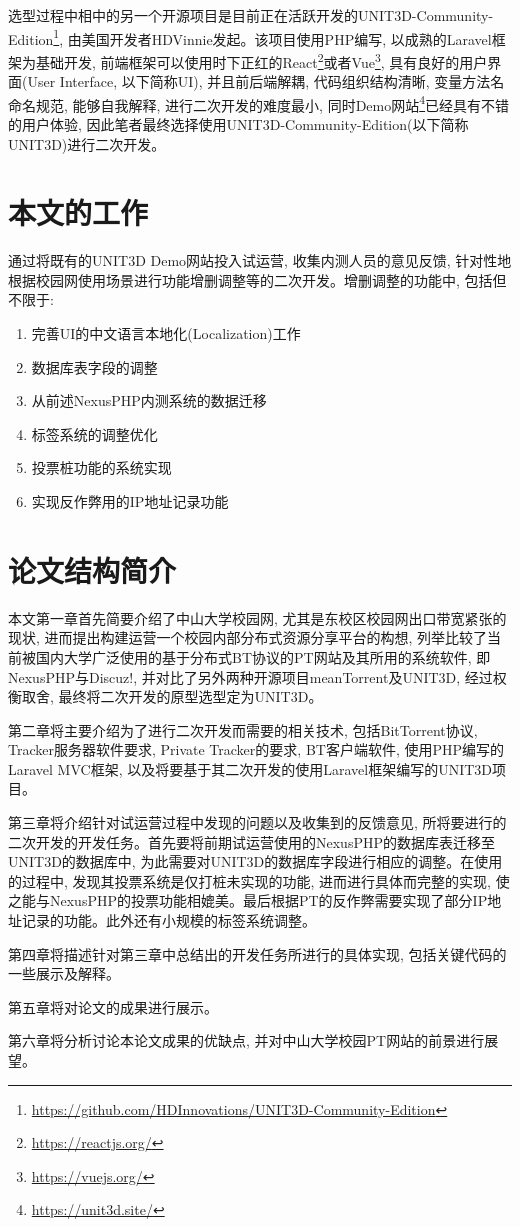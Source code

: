选型过程中相中的另一个开源项目是目前正在活跃开发的UNIT3D-Community-Edition\footnote{\url{https://github.com/HDInnovations/UNIT3D-Community-Edition}}, 由美国开发者HDVinnie发起。该项目使用PHP编写, 以成熟的Laravel框架为基础开发, 前端框架可以使用时下正红的React\footnote{\url{https://reactjs.org/}}或者Vue\footnote{\url{https://vuejs.org/}
}, 具有良好的用户界面(User Interface, 以下简称UI), 并且前后端解耦, 代码组织结构清晰, 变量方法名命名规范, 能够自我解释, 进行二次开发的难度最小, 同时Demo网站\footnote{\url{https://unit3d.site/}}已经具有不错的用户体验, 因此笔者最终选择使用UNIT3D-Community-Edition(以下简称UNIT3D)进行二次开发。

\section{本文的工作}

通过将既有的UNIT3D Demo网站投入试运营, 收集内测人员的意见反馈, 针对性地根据校园网使用场景进行功能增删调整等的二次开发。增删调整的功能中, 包括但不限于:

\begin{enumerate}[label=(\arabic*),leftmargin=*]
\item 完善UI的中文语言本地化(Localization)工作
\item 数据库表字段的调整
\item 从前述NexusPHP内测系统的数据迁移
\item 标签系统的调整优化
\item 投票桩功能的系统实现
\item 实现反作弊用的IP地址记录功能
\end{enumerate}


\section{论文结构简介}

\label{sec:arrangement}
本文第一章首先简要介绍了中山大学校园网, 尤其是东校区校园网出口带宽紧张的现状, 进而提出构建运营一个校园内部分布式资源分享平台的构想, 列举比较了当前被国内大学广泛使用的基于分布式BT协议的PT网站及其所用的系统软件, 即NexusPHP与Discuz!, 并对比了另外两种开源项目meanTorrent及UNIT3D, 经过权衡取舍, 最终将二次开发的原型选型定为UNIT3D。

第二章将主要介绍为了进行二次开发而需要的相关技术, 包括BitTorrent协议, Trac\-ker服务器软件要求, Private Tracker的要求, BT客户端软件, 使用PHP编写的Laravel MVC框架, 以及将要基于其二次开发的使用Laravel框架编写的UNIT3D项目。

第三章将介绍针对试运营过程中发现的问题以及收集到的反馈意见, 所将要进行的二次开发的开发任务。首先要将前期试运营使用的NexusPHP的数据库表迁移至UNIT3D的数据库中, 为此需要对UNIT3D的数据库字段进行相应的调整。在使用的过程中, 发现其投票系统是仅打桩未实现的功能, 进而进行具体而完整的实现, 使之能与NexusPHP的投票功能相媲美。最后根据PT的反作弊需要实现了部分IP地址记录的功能。此外还有小规模的标签系统调整。

第四章将描述针对第三章中总结出的开发任务所进行的具体实现, 包括关键代码的一些展示及解释。

第五章将对论文的成果进行展示。

第六章将分析讨论本论文成果的优缺点, 并对中山大学校园PT网站的前景进行展望。


